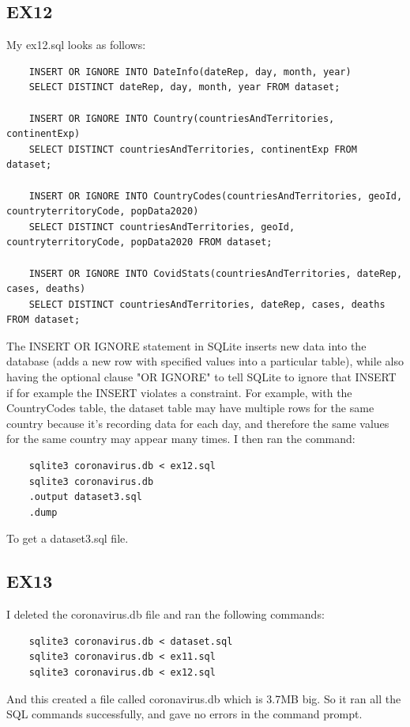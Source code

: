 \documentclass[]{article}
\begin{document}
\subsection{EX12}
My ex12.sql looks as follows:
\begin{verbatim}
    INSERT OR IGNORE INTO DateInfo(dateRep, day, month, year)
    SELECT DISTINCT dateRep, day, month, year FROM dataset;
    
    INSERT OR IGNORE INTO Country(countriesAndTerritories, continentExp)
    SELECT DISTINCT countriesAndTerritories, continentExp FROM dataset;
    
    INSERT OR IGNORE INTO CountryCodes(countriesAndTerritories, geoId, countryterritoryCode, popData2020)
    SELECT DISTINCT countriesAndTerritories, geoId, countryterritoryCode, popData2020 FROM dataset;
    
    INSERT OR IGNORE INTO CovidStats(countriesAndTerritories, dateRep, cases, deaths)
    SELECT DISTINCT countriesAndTerritories, dateRep, cases, deaths FROM dataset;

\end{verbatim}
The INSERT OR IGNORE statement in SQLite inserts new data into the database (adds a new row with specified values into a particular table), while also having the optional clause "OR IGNORE" to tell SQLite to ignore that INSERT if for example the INSERT violates a constraint. For example, with the CountryCodes table, the dataset table may have multiple rows for the same country because it's recording data for each day, and therefore the same values for the same country may appear many times.
I then ran the command:
\begin{verbatim}
    sqlite3 coronavirus.db < ex12.sql
    sqlite3 coronavirus.db
    .output dataset3.sql
    .dump
\end{verbatim}
To get a dataset3.sql file.

\subsection{EX13}
I deleted the coronavirus.db file and ran the following commands:
\begin{verbatim}
    sqlite3 coronavirus.db < dataset.sql
    sqlite3 coronavirus.db < ex11.sql
    sqlite3 coronavirus.db < ex12.sql
\end{verbatim}
And this created a file called coronavirus.db which is 3.7MB big. So it ran all the SQL commands successfully, and gave no errors in the command prompt.
\end{document}
